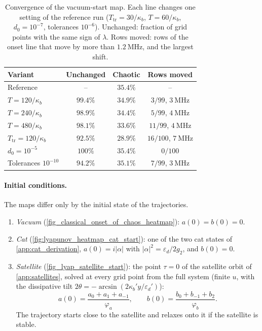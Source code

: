 \documentclass[aps,prx,reprint,floatfix,amsmath,amssymb,longbibliography]{revtex4-2}
\newcommand{\eps}{\varepsilon}
\begin{document}
\begin{table}[h]
    \centering
    \caption{Convergence of the vacuum-start map. Each line changes one setting of the reference run ($T_\text{tr}=30/\kappa_b$, $T=60/\kappa_b$, $d_0=10^{-7}$, tolerances $10^{-6}$). Unchanged: fraction of grid points with the same sign of $\lambda$. Rows moved: rows of the onset line that move by more than $1.2~\mathrm{MHz}$, and the largest shift.}
    \label{tab:lyap_convergence}
    \begin{tabular}{lccc}
        \toprule
        Variant & Unchanged & Chaotic & Rows moved \\
        \midrule
        Reference & -- & $35.4\%$ & -- \\
        $T=120/\kappa_b$ & $99.4\%$ & $34.9\%$ & $3/99$, $3~\mathrm{MHz}$ \\
        $T=240/\kappa_b$ & $98.9\%$ & $34.4\%$ & $5/99$, $4~\mathrm{MHz}$ \\
        $T=480/\kappa_b$ & $98.1\%$ & $33.6\%$ & $11/99$, $4~\mathrm{MHz}$ \\
        $T_\text{tr}=120/\kappa_b$ & $92.5\%$ & $28.9\%$ & $16/100$, $7~\mathrm{MHz}$ \\
        $d_0=10^{-5}$ & $100\%$ & $35.4\%$ & $0/100$ \\
        Tolerances $10^{-10}$ & $94.2\%$ & $35.1\%$ & $7/99$, $3~\mathrm{MHz}$ \\
        \bottomrule
    \end{tabular}
\end{table}

\paragraph*{Initial conditions.}
The maps differ only by the initial state of the trajectories.
\begin{enumerate}
    \item \emph{Vacuum} (\cref{fig_classical_onset_of_chaos_heatmap}): $a(0)=b(0)=0$.
    \item \emph{Cat} (\cref{fig:lyapunov_heatmap_cat_start}): one of the two cat states of \cref{app:cat_derivation}, $a(0)=i|\alpha|$ with $|\alpha|^2=\eps_d/2g_2$, and $b(0)=0$.
    \item \emph{Satellite} (\cref{fig_lyap_satellite_start}): the point $\tau=0$ of the satellite orbit of \cref{app:satellites}, solved at every grid point from the full system (finite $u$, with the dissipative tilt $2\theta=-\arcsin(2\kappa_b'y/\eps_d')$):
    \begin{equation}
        a(0)=\frac{a_0+a_1+a_{-1}}{\varphi_a},\qquad b(0)=\frac{b_0+b_{-1}+b_2}{\varphi_b}.
    \end{equation}
    The trajectory starts close to the satellite and relaxes onto it if the satellite is stable.
\end{enumerate}
\end{document}
